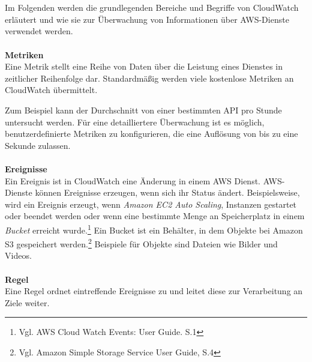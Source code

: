 \\\\
Im Folgenden werden die grundlegenden Bereiche und Begriffe von CloudWatch erläutert und wie sie zur Überwachung von Informationen über AWS-Dienste verwendet werden.
\\\\
\textbf{Metriken} \\
Eine Metrik stellt eine Reihe von Daten über die Leistung eines Dienstes in zeitlicher Reihenfolge dar. Standardmäßig werden viele kostenlose Metriken an CloudWatch übermittelt.

Zum Beispiel kann der Durchschnitt von einer bestimmten API pro Stunde untersucht werden. Für eine detailliertere Überwachung ist es möglich, benutzerdefinierte Metriken zu konfigurieren, die eine Auflösung von bis zu eine Sekunde zulassen. %
\\\\
\textbf{Ereignisse}\\
Ein Ereignis ist in CloudWatch eine Änderung in einem AWS Dienst. AWS-Dienste können Ereignisse erzeugen, wenn sich ihr Status ändert. %
Beispielsweise, wird ein Ereignis erzeugt, wenn \textit{Amazon EC2 Auto Scaling}, Instanzen gestartet oder beendet werden oder wenn eine bestimmte Menge an Speicherplatz in einem \textit{Bucket} erreicht wurde.\footnote{Vgl. AWS Cloud Watch Events: User Guide. S.1\cite{AMZ13}} Ein Bucket ist ein Behälter, in dem Objekte bei Amazon S3 gespeichert werden.\footnote{Vgl. Amazon Simple Storage Service User Guide, S.4\cite{AMZ18}} Beispiele für Objekte sind Dateien wie Bilder und Videos. 
\\\\
\textbf{Regel} \\
Eine Regel ordnet eintreffende Ereignisse zu und leitet diese zur Verarbeitung an Ziele weiter.
